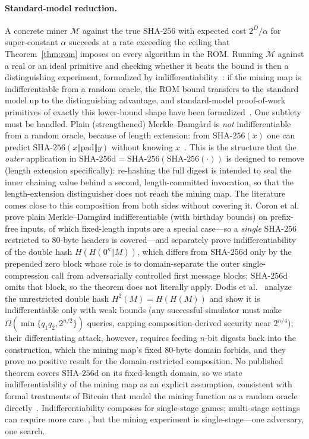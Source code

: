 \documentclass[11pt]{article}
\theoremstyle{remark}
\newcommand{\SHA}{\mathrm{SHA\text{-}256}}
\newcommand{\SHAd}{\mathrm{SHA\text{-}256d}}
\begin{document}
\paragraph{Standard-model reduction.}
A concrete miner $\mathcal{M}$ against the true $\SHA$ with expected cost
$2^{D}/\alpha$ for super-constant $\alpha$ succeeds at a rate exceeding the
ceiling that Theorem~\ref{thm:rom} imposes on every algorithm in the ROM.
Running $\mathcal{M}$ against a real or an ideal primitive and checking
whether it beats the bound is then a distinguishing experiment, formalized
by indifferentiability~\cite{mrh}: if the mining map is indifferentiable
from a random oracle, the ROM bound transfers to the standard model up to
the distinguishing advantage, and standard-model proof-of-work primitives
of exactly this lower-bound shape have been formalized~\cite{gkp}. One
subtlety must be handled. Plain (strengthened) Merkle--Damgård is
\emph{not} indifferentiable from a random oracle, because of length
extension: from $\SHA(x)$ one can predict $\SHA(x\Vert\mathrm{pad}\Vert
y)$ without knowing $x$~\cite{coron}. This is the structure that the
\emph{outer} application in $\SHAd=\SHA(\SHA(\cdot))$ is designed to remove
(length extension specifically): re-hashing the full digest is intended to
seal the inner chaining value behind a second, length-committed
invocation, so that the length-extension distinguisher does not reach the
mining map. The literature comes close to this composition from both
sides without covering it. Coron et al.~\cite{coron} prove plain
Merkle--Damgård indifferentiable (with birthday bounds) on prefix-free
inputs, of which fixed-length inputs are a special case---so a
\emph{single} $\SHA$ restricted to 80-byte headers is covered---and
separately prove indifferentiability of the double hash
$H(H(0^{\kappa}\Vert M))$, which differs from $\SHAd$ only by the
prepended zero block whose role is to domain-separate the outer
single-compression call from adversarially controlled first message
blocks; $\SHAd$ omits that block, so the theorem does not literally
apply. Dodis et al.~\cite{drst} analyze the unrestricted double hash
$H^{2}(M)=H(H(M))$ and show it is indifferentiable only with weak
bounds (any successful simulator must make
$\Omega(\min\{q_{1}q_{2},2^{n/2}\})$ queries, capping
composition-derived security near $2^{n/4}$); their differentiating
attack, however, requires feeding $n$-bit digests back into the
construction, which the mining map's fixed 80-byte domain forbids, and
they prove no positive result for the domain-restricted composition.
No published theorem covers $\SHAd$ on its fixed-length domain, so we
state indifferentiability of the mining map as an explicit assumption,
consistent with formal treatments of Bitcoin that model the mining
function as a random oracle directly~\cite{backbone}.
Indifferentiability composes for single-stage games;
multi-stage settings can require more care~\cite{rss}, but the mining
experiment is single-stage---one adversary, one search.
\end{document}

